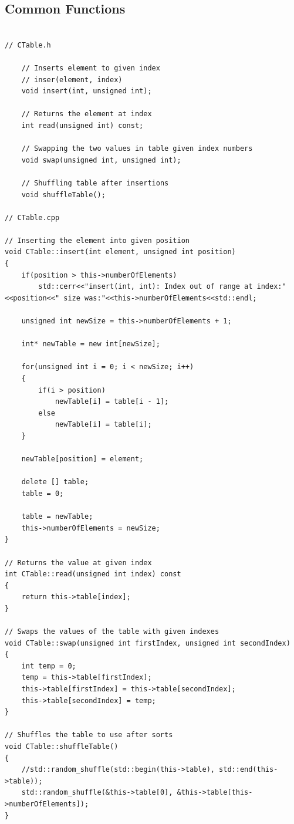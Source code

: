 \documentclass{article}
\begin{document}
	
	\subsection{Common Functions}
	
		\begin{lstlisting}[label=CTable-common, caption=Common Functions]
	
// CTable.h
	
    // Inserts element to given index
    // inser(element, index)
    void insert(int, unsigned int);

    // Returns the element at index
    int read(unsigned int) const;

    // Swapping the two values in table given index numbers
    void swap(unsigned int, unsigned int);

    // Shuffling table after insertions
    void shuffleTable();
    
// CTable.cpp
    
// Inserting the element into given position
void CTable::insert(int element, unsigned int position)
{
    if(position > this->numberOfElements)
        std::cerr<<"insert(int, int): Index out of range at index:"<<position<<" size was:"<<this->numberOfElements<<std::endl;

    unsigned int newSize = this->numberOfElements + 1;

    int* newTable = new int[newSize];

    for(unsigned int i = 0; i < newSize; i++)
    {
        if(i > position)
            newTable[i] = table[i - 1];
        else
            newTable[i] = table[i];
    }

    newTable[position] = element;

    delete [] table;
    table = 0;

    table = newTable;
    this->numberOfElements = newSize;
}

// Returns the value at given index
int CTable::read(unsigned int index) const
{
    return this->table[index];
}

// Swaps the values of the table with given indexes
void CTable::swap(unsigned int firstIndex, unsigned int secondIndex)
{
    int temp = 0;
    temp = this->table[firstIndex];
    this->table[firstIndex] = this->table[secondIndex];
    this->table[secondIndex] = temp;
}

// Shuffles the table to use after sorts
void CTable::shuffleTable()
{
    //std::random_shuffle(std::begin(this->table), std::end(this->table));
    std::random_shuffle(&this->table[0], &this->table[this->numberOfElements]);
}

	\end{lstlisting}
	
\end{document}
